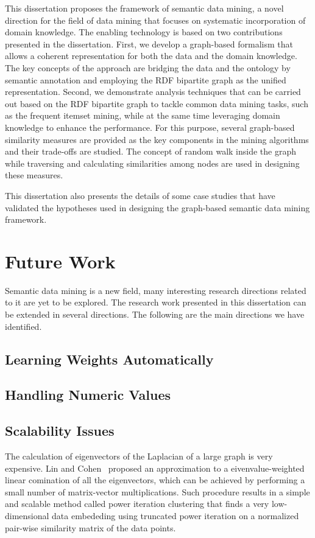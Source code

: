 This dissertation proposes the framework of semantic data mining, a novel direction for the field of data mining that focuses on systematic incorporation of domain knowledge. The enabling technology is based on two contributions presented in the dissertation. First, we develop a graph-based formalism that allows a coherent representation for both the data and the domain knowledge. The key concepts of the approach are bridging the data and the ontology by semantic annotation and employing the RDF bipartite graph as the unified representation. Second, we demonstrate analysis techniques that can be carried out based on the RDF bipartite graph to tackle common data mining tasks, such as the frequent itemset mining, while at the same time leveraging domain knowledge to enhance the performance. For this purpose, several graph-based similarity measures are provided as the key components in the mining algorithms and their trade-offs are studied. The concept of random walk inside the graph while traversing and calculating similarities among nodes are used in designing these measures. 

This dissertation also presents the details of some case studies that have validated the hypotheses used in designing the graph-based semantic data mining framework.

\section{Future Work}
Semantic data mining is a new field, many interesting research directions related to it are yet to be explored. The research work presented in this dissertation can be extended in several directions. The following are the main directions we have identified.

\subsection{Learning Weights Automatically}
\subsection{Handling Numeric Values}
\subsection{Scalability Issues}
The calculation of eigenvectors of the Laplacian of a large graph is very expensive. Lin and Cohen~\cite{LinEtal2010ICML} proposed an approximation to a eivenvalue-weighted linear comination of all the eigenvectors, which can be achieved by performing a small number of matrix-vector multiplications.  Such procedure results in a simple and scalable method called power iteration clustering that finds a very low-dimensional data embededing using truncated power iteration on a normalized pair-wise similarity matrix of the data points.

